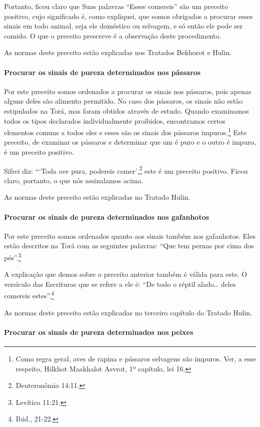 Portanto, ficou claro que Suas palavras ``Esses comereis'' são um preceito positivo, cujo significado é, como expliquei, que somos obrigados
a procurar esses sinais em todo animal, seja ele doméstico ou selvagem,
e só então ele pode ser comido. O que o preceito prescreve é a
observação deste procedimento.

As normas deste preceito estão explicadas nos Tratados Bekhorot e Hulin.

\paragraph{Procurar os sinais de pureza determinados nos pássaros}

Por este preceito somos ordenados a procurar os sinais nos pássaros,
pois apenas alguns deles são alimento permitido. No caso dos pássaros,
os sinais não estão estipulados na Torá, mas foram obtidos através de
estudo. Quando examinamos todos os tipos declarados individualmente
proibidos, encontramos certos elementos comuns a todos eles e esses são
os sinais dos pássaros impuros.\footnote{Como regra geral, aves de rapina e pássaros selvagens são impuros.
Ver, a esse respeito, Hilkhot Maakhalot Asvrot, 1º capítulo, lei 16.} Este preceito, de examinar os pássaros e
determinar que um é puro e o outro é impuro, é um preceito positivo.

Sifrei diz: ```Toda ave pura, podereis comer',\footnote{Deuteronômio 14:11.} este
é um preceito positivo. Ficou claro, portanto, o que nós assinalamos
acima.

As normas deste preceito estão explicadas no Tratado Hulin.

\paragraph{Procurar os sinais de pureza determinados nos gafanhotos}

Por este preceito somos ordenados quanto aos sinais também nos
gafanhotos. Eles estão descritos na Torá com as seguintes palavras:
``Que tem pernas por cima dos pés''.\footnote{Levítico 11:21.}

A explicação que demos sobre o preceito anterior também é válida para
este. O versículo das Escrituras que se refere a ele é: ``De todo o
réptil alado\ldots{} deles comereis estes''.\footnote{Ibid., 21-22.}

As normas deste preceito estão explicadas no terceiro capítulo do
Tratado Hulin.

\paragraph{Procurar os sinais de pureza determinados nos peixes}

